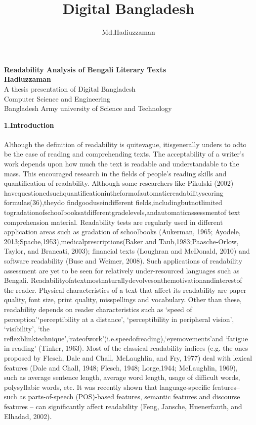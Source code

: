 \documentclass[9pt]{article}
\title{\textbf{Digital Bangladesh}}
\author{Md.Hadiuzzaman}
\begin{document}
\begin{center}

\huge{\textbf{Readability Analysis of Bengali Literary Texts}}\\
\vspace{0.5cm}
\vspace{2cm}
\large{\textbf{Hadiuzzaman}}\\
\vspace{8cm}
A thesis presentation of Digital Bangladesh\\
\vspace{1.5cm}
Computer Science and Engineering\\
Bangladesh Army university of Science and Technology
\end{center}
\vspace{5cm}
\huge{\textbf{1.Introduction }}\\
\\
Although the deﬁnition of readability is quitevague, 
itisgenerally unders to odto be the ease of reading and comprehending texts. The acceptability of a writer’s work depends upon how much the text is readable and understandable to the mass. This encouraged research in the ﬁelds of people’s reading skills and quantiﬁcation of readability. Although some researchers like Pikulski (2002) havequestionedsuchquantiﬁcationintheformofautomaticreadabilityscoring formulas(36),theydo ﬁndgooduseindiﬀerent ﬁelds,includingbutnotlimited togradationofschoolbooksatdiﬀerentgradelevels,andautomaticassessmentof text comprehension material. Readability tests are regularly used in diﬀerent application areas such as gradation of schoolbooks (Aukerman, 1965; Ayodele, 2013;Spache,1953),medicalprescriptions(Baker and Taub,1983;Paasche-Orlow, Taylor, and Brancati, 2003); ﬁnancial texts (Loughran and McDonald, 2010) and software readability (Buse and Weimer, 2008). Such applications of readability assessment are yet to be seen for relatively under-resourced languages such as Bengali. Readabilityofatextmostnaturallydevolvesonthemotivationandinterestof the reader. Physical characteristics of a text that aﬀect its readability are paper quality, font size, print quality, misspellings and vocabulary. Other than these, readability depends on reader characteristics such as ‘speed of perception’‘perceptibility at a distance’, ‘perceptibility in peripheral vision’, ‘visibility’, ‘the reﬂexblinktechnique’,‘rateofwork’(i.e.speedofreading),‘eyemovements’and ‘fatigue in reading’ (Tinker, 1963). Most of the classical readability indices (e.g. the ones proposed by Flesch, Dale and Chall, McLaughlin, and Fry, 1977) deal with lexical features (Dale and Chall, 1948; Flesch, 1948; Lorge,1944; McLaughlin, 1969), such as average sentence length, average word length, usage of diﬃcult words, polysyllabic words, etc. It was recently shown that language-speciﬁc features– such as parts-of-speech (POS)-based features, semantic features and discourse features – can signiﬁcantly aﬀect readability (Feng, Jansche, Huenerfauth, and Elhadad, 2002).\\
\end{document}
